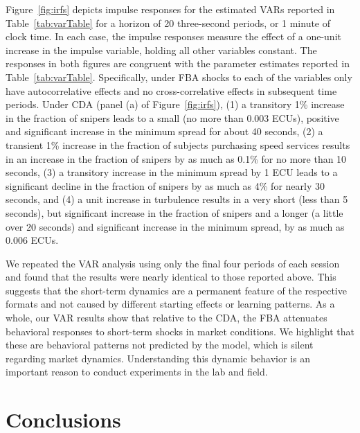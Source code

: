 \documentclass[12pt]{article}
\begin{document}
Figure~\ref{fig:irfs} depicts impulse responses for the estimated VARs reported in Table~\ref{tab:varTable} for a horizon of 20 three-second periods, or 1 minute of clock time. In each case, the impulse responses measure the effect of a one-unit increase in the impulse variable, holding all other variables constant.
The responses in both figures are congruent with the parameter estimates reported in Table~\ref{tab:varTable}. Specifically, under FBA shocks to each of the variables only have autocorrelative effects and no cross-correlative effects in subsequent time periods.
Under CDA (panel (a) of Figure~\ref{fig:irfs}), (1) a transitory 1\% increase in the fraction of snipers leads to a small (no more than 0.003 ECUs), positive and significant increase in the minimum spread for about 40 seconds, (2) a transient 1\% increase in the fraction of subjects purchasing speed services results in an increase in the fraction of snipers by as much as 0.1\% for no more than 10 seconds, (3) a transitory increase in the minimum spread by 1 ECU leads to a significant decline in the fraction of snipers by as much as 4\% for nearly 30 seconds, and (4) a unit increase in turbulence results in a very short (less than 5 seconds), but significant increase in the fraction of snipers and a longer (a little over 20 seconds) and significant increase in the minimum spread, by as much as 0.006 ECUs.

We repeated the VAR analysis using only the final four periods of each session and found that the results were nearly identical to those reported above. This suggests that the short-term dynamics are a permanent feature of the respective formats and not caused by different starting effects or learning patterns. As a whole, our VAR results show that relative to the CDA, the FBA attenuates behavioral responses to short-term shocks in market conditions. We highlight that these are behavioral patterns not predicted by the model, which is silent regarding market dynamics. Understanding this dynamic behavior is an important reason to conduct experiments in the lab and field.

\section{Conclusions \label{Conclusions}}
\end{document}
